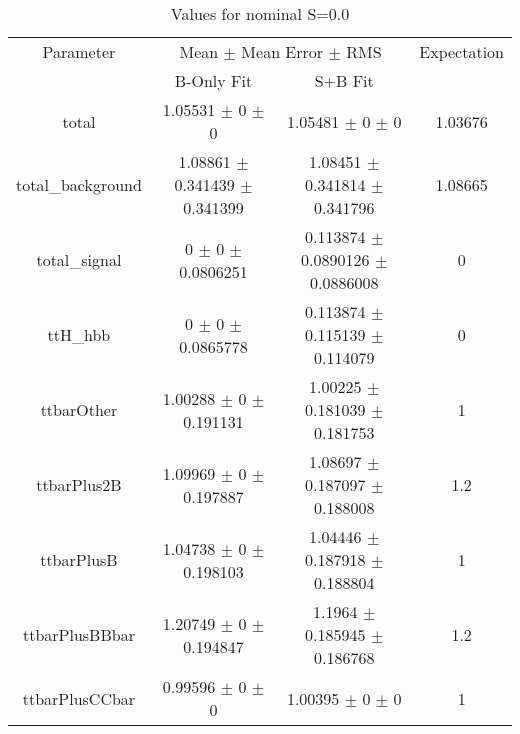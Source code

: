 \begin{table}
\centering
\caption{Values for nominal S=0.0}
\begin{tabular}{cccc}
\toprule
Parameter & \multicolumn{2}{c}{Mean $\pm$ Mean Error $\pm$ RMS} & Expectation\\
 & B-Only Fit & S+B Fit & \\
\midrule
total & \num{1.05531} $\pm$ \num{0} $\pm$ \num{0} & \num{1.05481} $\pm$ \num{0} $\pm$ \num{0} & \num{1.03676}\\
total\_background & \num{1.08861} $\pm$ \num{0.341439} $\pm$ \num{0.341399} & \num{1.08451} $\pm$ \num{0.341814} $\pm$ \num{0.341796} & \num{1.08665}\\
total\_signal & \num{0} $\pm$ \num{0} $\pm$ \num{0.0806251} & \num{0.113874} $\pm$ \num{0.0890126} $\pm$ \num{0.0886008} & \num{0}\\
ttH\_hbb & \num{0} $\pm$ \num{0} $\pm$ \num{0.0865778} & \num{0.113874} $\pm$ \num{0.115139} $\pm$ \num{0.114079} & \num{0}\\
ttbarOther & \num{1.00288} $\pm$ \num{0} $\pm$ \num{0.191131} & \num{1.00225} $\pm$ \num{0.181039} $\pm$ \num{0.181753} & \num{1}\\
ttbarPlus2B & \num{1.09969} $\pm$ \num{0} $\pm$ \num{0.197887} & \num{1.08697} $\pm$ \num{0.187097} $\pm$ \num{0.188008} & \num{1.2}\\
ttbarPlusB & \num{1.04738} $\pm$ \num{0} $\pm$ \num{0.198103} & \num{1.04446} $\pm$ \num{0.187918} $\pm$ \num{0.188804} & \num{1}\\
ttbarPlusBBbar & \num{1.20749} $\pm$ \num{0} $\pm$ \num{0.194847} & \num{1.1964} $\pm$ \num{0.185945} $\pm$ \num{0.186768} & \num{1.2}\\
ttbarPlusCCbar & \num{0.99596} $\pm$ \num{0} $\pm$ \num{0} & \num{1.00395} $\pm$ \num{0} $\pm$ \num{0} & \num{1}\\
\bottomrule
\end{tabular}
\end{table}